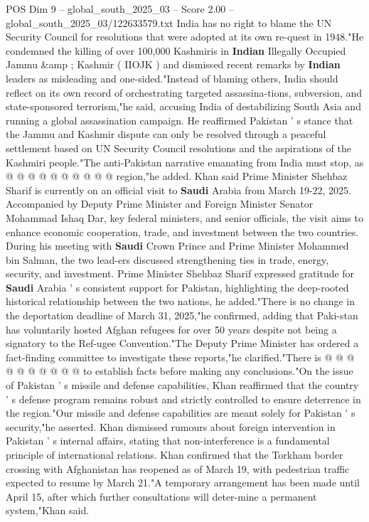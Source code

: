 \begin{textsample}{POS Dim 9 – global\_south\_2025\_03 – Score 2.00 – global\_south\_2025\_03/122633579.txt}
India has no right to blame the UN Security Council for resolutions that were adopted at its own re-quest in 1948."He condemned the killing of over 100,000 Kashmiris in \textbf{Indian} Illegally Occupied Jammu \&amp ; Kashmir ( IIOJK ) and dismissed recent remarks by \textbf{Indian} leaders as misleading and one-sided."Instead of blaming others, India should reflect on its own record of orchestrating targeted assassina-tions, subversion, and state-sponsored terrorism,"he said, accusing India of destabilizing South Asia and running a global assassination campaign.
He reaffirmed Pakistan ' s stance that the Jammu and Kashmir dispute can only be resolved through a peaceful settlement based on UN Security Council resolutions and the aspirations of the Kashmiri people."The anti-Pakistan narrative emanating from India must stop, as @ @ @ @ @ @ @ @ @ @ region,"he added.
Khan said Prime Minister Shehbaz Sharif is currently on an official visit to \textbf{Saudi} Arabia from March 19-22, 2025.
Accompanied by Deputy Prime Minister and Foreign Minister Senator Mohammad Ishaq Dar, key federal ministers, and senior officials, the visit aims to enhance economic cooperation, trade, and investment between the two countries.
During his meeting with \textbf{Saudi} Crown Prince and Prime Minister Mohammed bin Salman, the two lead-ers discussed strengthening ties in trade, energy, security, and investment.
Prime Minister Shehbaz Sharif expressed gratitude for \textbf{Saudi} Arabia ' s consistent support for Pakistan, highlighting the deep-rooted historical relationship between the two nations, he added."There is no change in the deportation deadline of March 31, 2025,"he confirmed, adding that Paki-stan has voluntarily hosted Afghan refugees for over 50 years despite not being a signatory to the Ref-ugee Convention."The Deputy Prime Minister has ordered a fact-finding committee to investigate these reports,"he clarified."There is @ @ @ @ @ @ @ @ @ @ to establish facts before making any conclusions."On the issue of Pakistan ' s missile and defense capabilities, Khan reaffirmed that the country ' s defense program remains robust and strictly controlled to ensure deterrence in the region."Our missile and defense capabilities are meant solely for Pakistan ' s security,"he asserted.
Khan dismissed rumours about foreign intervention in Pakistan ' s internal affairs, stating that non-interference is a fundamental principle of international relations.
Khan confirmed that the Torkham border crossing with Afghanistan has reopened as of March 19, with pedestrian traffic expected to resume by March 21."A temporary arrangement has been made until April 15, after which further consultations will deter-mine a permanent system,"Khan said.

\end{textsample}
